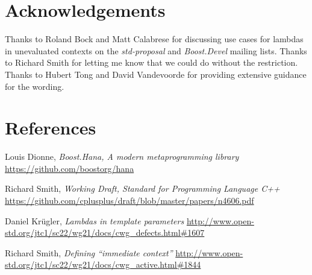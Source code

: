 \documentclass{wg21}
\begin{document}
\section{Acknowledgements}
Thanks to Roland Bock and Matt Calabrese for discussing use cases for lambdas
in unevaluated contexts on the \textit{std-proposal} and \textit{Boost.Devel}
mailing lists. Thanks to Richard Smith for letting me know that we could do
without the restriction. Thanks to Hubert Tong and David Vandevoorde for
providing extensive guidance for the wording.


\section{References}
\renewcommand{\section}[2]{}%
\begin{thebibliography}{9}

    Louis Dionne,
    \emph{Boost.Hana, A modern metaprogramming library}\newline
    \url{https://github.com/boostorg/hana}

    Richard Smith,
    \emph{Working Draft, Standard for Programming Language C++}\newline
    \url{https://github.com/cplusplus/draft/blob/master/papers/n4606.pdf}

    Daniel Kr{\"u}gler,
    \emph{Lambdas in template parameters}\newline
    \url{http://www.open-std.org/jtc1/sc22/wg21/docs/cwg_defects.html#1607}

    Richard Smith,
    \emph{Defining “immediate context”}\newline
    \url{http://www.open-std.org/jtc1/sc22/wg21/docs/cwg_active.html#1844}

\end{thebibliography}
\end{document}
